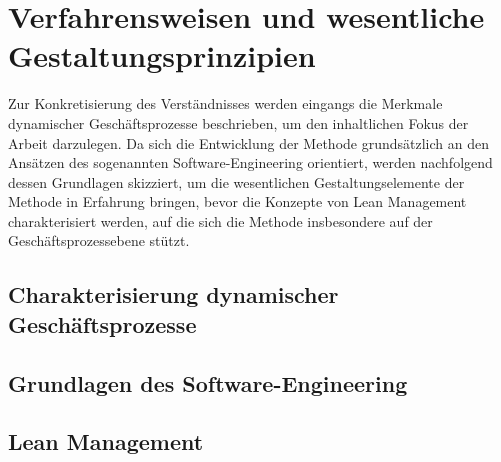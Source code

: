 \section{Verfahrensweisen und wesentliche Gestaltungsprinzipien}\label{sec:methodenGrundlage}
Zur Konkretisierung des Verständnisses werden eingangs die Merkmale dynamischer Geschäftsprozesse beschrieben, um den inhaltlichen Fokus der Arbeit darzulegen.
Da sich die Entwicklung der Methode grundsätzlich an den Ansätzen des sogenannten Software-Engineering orientiert, werden nachfolgend dessen Grundlagen skizziert, um die wesentlichen Gestaltungselemente der Methode in Erfahrung bringen, bevor die Konzepte von Lean Management charakterisiert werden, auf die sich die Methode insbesondere auf der Geschäftsprozessebene stützt.

\subsection{Charakterisierung dynamischer Geschäftsprozesse}

\subsection{Grundlagen des Software-Engineering}




\cite{Becker.2001}


\subsection{Lean Management}





